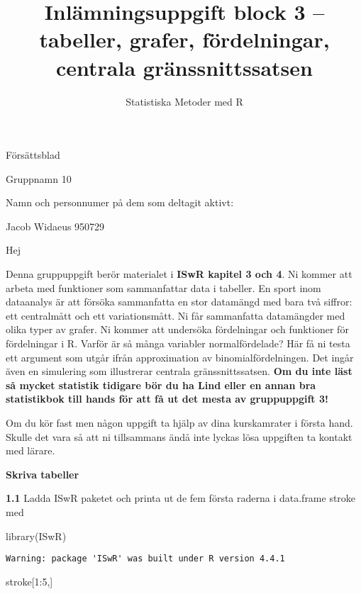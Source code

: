 \documentclass[
  letterpaper,
  DIV=11,
  numbers=noendperiod]{scrartcl}
\title{Inlämningsuppgift block 3 -- tabeller, grafer, fördelningar,
centrala gränssnittssatsen}
\author{Statistiska Metoder med R}
\date{}
\newenvironment{Shaded}{\begin{snugshade}}{\end{snugshade}}
\newcommand{\DecValTok}[1]{\textcolor[rgb]{0.68,0.00,0.00}{#1}}
\newcommand{\FunctionTok}[1]{\textcolor[rgb]{0.28,0.35,0.67}{#1}}
\newcommand{\NormalTok}[1]{\textcolor[rgb]{0.00,0.23,0.31}{#1}}
\newcommand{\SpecialCharTok}[1]{\textcolor[rgb]{0.37,0.37,0.37}{#1}}
\begin{document}
\maketitle


Försättsblad

Gruppnamn 10

Namn och personnumer på dem som deltagit aktivt:

Jacob Widaeus 950729

Hej

Denna gruppuppgift berör materialet i \textbf{ISwR kapitel 3 och 4}. Ni
kommer att arbeta med funktioner som sammanfattar data i tabeller. En
sport inom dataanalys är att försöka sammanfatta en stor datamängd med
bara två siffror: ett centralmått och ett variationsmått. Ni får
sammanfatta datamängder med olika typer av grafer. Ni kommer att
undersöka fördelningar och funktioner för fördelningar i R. Varför är så
många variabler normalfördelade? Här få ni testa ett argument som utgår
ifrån approximation av binomialfördelningen. Det ingår även en
simulering som illustrerar centrala gränssnittssatsen. \textbf{Om du
inte läst så mycket statistik tidigare bör du ha Lind eller en annan bra
statistikbok till hands för att få ut det mesta av gruppuppgift 3!}

Om du kör fast men någon uppgift ta hjälp av dina kurskamrater i första
hand. Skulle det vara så att ni tillsammans ändå inte lyckas lösa
uppgiften ta kontakt med lärare.

\textbf{Skriva tabeller}

\textbf{1.1} Ladda ISwR paketet och printa ut de fem första raderna i
data.frame stroke med

\begin{Shaded}
\begin{Highlighting}[]
\FunctionTok{library}\NormalTok{(ISwR)}
\end{Highlighting}
\end{Shaded}

\begin{verbatim}
Warning: package 'ISwR' was built under R version 4.4.1
\end{verbatim}

\begin{Shaded}
\begin{Highlighting}[]
\NormalTok{stroke[}\DecValTok{1}\SpecialCharTok{:}\DecValTok{5}\NormalTok{,]}
\end{Highlighting}
\end{Shaded}
\end{document}
